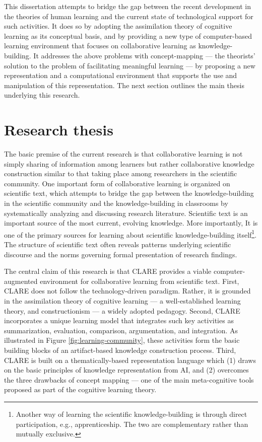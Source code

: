 This dissertation attempts to bridge the gap between the recent development
in the theories of human learning and the current state of technological
support for such activities. It does so by adopting the assimilation theory
of cognitive learning as its conceptual basis, and by providing a new type
of computer-based learning environment that focuses on collaborative
learning as knowledge-building. It addresses the above problems with
concept-mapping --- the theorists' solution to the problem of facilitating
meaningful learning --- by proposing a new representation and a computational
environment that supports the use and manipulation of this representation.
The next section outlines the main thesis underlying this research.


\section{Research thesis}
\label{sec:thesis}

The basic premise of the current research is that collaborative learning is
not simply sharing of information among learners but rather collaborative
knowledge construction similar to that taking place among researchers in
the scientific community. One important form of collaborative learning is
organized on scientific text, which attempts to bridge the gap between the
knowledge-building in the scientific community and the knowledge-building
in classrooms by systematically analyzing and discussing research
literature. Scientific text is an important source of the most current,
evolving knowledge. More importantly, It is one of the primary sources for
learning about scientific knowledge-building itself\footnote{Another way of
learning the scientific knowledge-building is through direct participation,
e.g., apprenticeship. The two are complementary rather than mutually
exclusive.}. The structure of scientific text often reveals patterns
underlying scientific discourse and the norms governing formal presentation
of research findings.

The central claim of this research is that CLARE provides a viable
computer-augmented environment for collaborative learning from scientific
text. First, CLARE does not follow the technology-driven paradigm. Rather,
it is grounded in the assimilation theory of cognitive learning --- a
well-established learning theory, and constructionism --- a widely adopted
pedagogy. Second, CLARE incorporates a unique learning model that
integrates such key activities as summarization, evaluation, comparison,
argumentation, and integration.  As illustrated in Figure
\ref{fig:learning-community}, these activities form the basic building
blocks of an artifact-based knowledge construction process. Third, CLARE is
built on a thematically-based representation language which (1) draws on
the basic principles of knowledge representation from AI, and (2) overcomes
the three drawbacks of concept mapping --- one of the main meta-cognitive
tools proposed as part of the cognitive learning theory.

